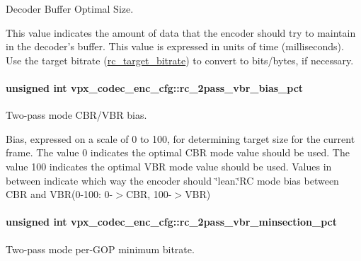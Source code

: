 Decoder Buffer Optimal Size. 

This value indicates the amount of data that the encoder should try to maintain in the decoder's buffer. This value is expressed in units of time (milliseconds). Use the target bitrate (\hyperlink{structvpx__codec__enc__cfg_ab8339685175d66710f482706cc9f0aed}{rc\-\_\-target\-\_\-bitrate}) to convert to bits/bytes, if necessary. \hypertarget{structvpx__codec__enc__cfg_a21c21ff097890dc3a450731c9b504cf4}{
\paragraph[{rc\-\_\-2pass\-\_\-vbr\-\_\-bias\-\_\-pct}]{\setlength{\rightskip}{0pt plus 5cm}unsigned int vpx\-\_\-codec\-\_\-enc\-\_\-cfg\-::rc\-\_\-2pass\-\_\-vbr\-\_\-bias\-\_\-pct}}\label{structvpx__codec__enc__cfg_a21c21ff097890dc3a450731c9b504cf4}


Two-\/pass mode C\-B\-R/\-V\-B\-R bias. 

Bias, expressed on a scale of 0 to 100, for determining target size for the current frame. The value 0 indicates the optimal C\-B\-R mode value should be used. The value 100 indicates the optimal V\-B\-R mode value should be used. Values in between indicate which way the encoder should \char`\"{}lean.\char`\"{}R\-C mode bias between C\-B\-R and V\-B\-R(0-\/100\-: 0-\/$>$C\-B\-R, 100-\/$>$V\-B\-R) \hypertarget{structvpx__codec__enc__cfg_a21eb9fce0844ae07b617bf3f0a25f5a5}{
\paragraph[{rc\-\_\-2pass\-\_\-vbr\-\_\-minsection\-\_\-pct}]{\setlength{\rightskip}{0pt plus 5cm}unsigned int vpx\-\_\-codec\-\_\-enc\-\_\-cfg\-::rc\-\_\-2pass\-\_\-vbr\-\_\-minsection\-\_\-pct}}\label{structvpx__codec__enc__cfg_a21eb9fce0844ae07b617bf3f0a25f5a5}


Two-\/pass mode per-\/\-G\-O\-P minimum bitrate. 

